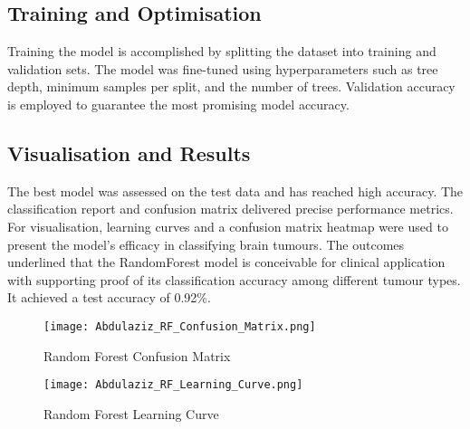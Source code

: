 \documentclass[conference]{IEEEtran}
\begin{document}
\subsection{Training and Optimisation}
Training the model is accomplished by splitting the dataset into training and validation sets. The model was fine-tuned using hyperparameters such as tree depth, minimum samples per split, and the number of trees. Validation accuracy is employed to guarantee the most promising model accuracy.

\subsection{Visualisation and Results}
The best model was assessed on the test data and has reached high accuracy. The classification report and confusion matrix delivered precise performance metrics. For visualisation, learning curves and a confusion matrix heatmap were used to present the model’s efficacy in classifying brain tumours. The outcomes underlined that the RandomForest model is conceivable for clinical application with supporting proof of its classification accuracy among different tumour types. It achieved a test accuracy of 0.92\%.

\begin{figure}[htbp]
    \centering
    \texttt{[image: Abdulaziz\_RF\_Confusion\_Matrix.png]}
    \caption{Random Forest Confusion Matrix}
    \label{fig:confusion_matrix}
\end{figure}

\begin{figure}[htbp]
    \centering
    \texttt{[image: Abdulaziz\_RF\_Learning\_Curve.png]}
    \caption{Random Forest Learning Curve}
    \label{fig:learning_curve}
\end{figure}
\end{document}
